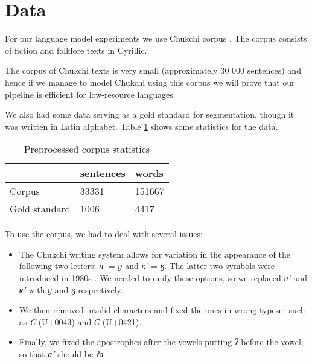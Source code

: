 \documentclass[leqno]{article}
\begin{document}
\section{Data}

For our language model experiments we use Chukchi corpus
\parencite{chukchicorpus}. The corpus consists of fiction and folklore
texts in Cyrillic.

The corpus of Chukchi texts is very small (approximately 30 000 sentences)
and hence if we manage to model Chukchi using this corpus
we will prove that our pipeline is efficient for low-resource
languages.

We also had some data serving as a gold standard for segmentation, though it was written in Latin alphabet. Table \ref{tab:preproc} shows some statistics for the data.

\begin{table}[h]
\centering
\begin{tabular}{|l|l|l|}
\hline
{\color[HTML]{000000} }              & {\color[HTML]{000000} sentences} & {\color[HTML]{000000} words}  \\ \hline
{\color[HTML]{000000} Corpus}        & {\color[HTML]{000000} 33331}     & {\color[HTML]{000000} 151667} \\ \hline
{\color[HTML]{000000} Gold standard} & {\color[HTML]{000000} 1006}      & {\color[HTML]{000000} 4417}   \\ \hline
\end{tabular}
\caption{Preprocessed corpus statistics}
\label{tab:preproc}
\end{table}

To use the corpus, we had to deal with several issues: 
\begin{itemize}
    \item The Chukchi writing system allows for variation in the appearance
    of the following two letters:
    \textit{н'} = \textit{ӈ} and \textit{к'} = \textit{ӄ}. The latter two symbols
    were introduced in 1980s \parencite{chukchiLetters}.
    We needed to unify these options, so we replaced \textit{н'} and
    \textit{к'} with \textit{ӈ} and \textit{ӄ} respectively.
    \item We then removed invalid characters and fixed the ones in wrong
    typeset such as \textit{C} (U+0043) and \textit{С} (U+0421).
    \item Finally, we fixed the apostrophes after the vowels putting
    \textit{ʔ} before the vowel, so that \textit{а’} should be \textit{ʔа}
\end{itemize}
\end{document}
